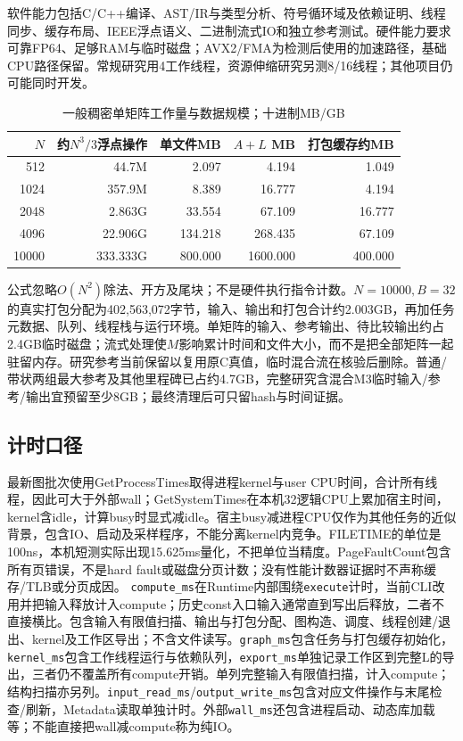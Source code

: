 \documentclass[UTF8,a4paper,11pt]{ctexart}
\begin{document}
软件能力包括C/C++编译、AST/IR与类型分析、符号循环域及依赖证明、线程同步、缓存布局、IEEE浮点语义、二进制流式IO和独立参考测试。硬件能力要求可靠FP64、足够RAM与临时磁盘；AVX2/FMA为检测后使用的加速路径，基础CPU路径保留。常规研究用4工作线程，资源伸缩研究另测8/16线程；其他项目仍可能同时开发。

\begin{table}[htbp]\centering\small
\caption{一般稠密单矩阵工作量与数据规模；十进制MB/GB}
\begin{tabular}{rrrrr}\toprule
$N$&约$N^3/3$浮点操作&单文件MB&$A+L$ MB&打包缓存约MB\\\midrule
512&44.7M&2.097&4.194&1.049\\
1024&357.9M&8.389&16.777&4.194\\
2048&2.863G&33.554&67.109&16.777\\
4096&22.906G&134.218&268.435&67.109\\
10000&333.333G&800.000&1600.000&400.000\\\bottomrule
\end{tabular}
\end{table}
公式忽略$O(N^2)$除法、开方及尾块；不是硬件执行指令计数。$N=10000,B=32$的真实打包分配为402,563,072字节，输入、输出和打包合计约2.003GB，再加任务元数据、队列、线程栈与运行环境。单矩阵的输入、参考输出、待比较输出约占2.4GB临时磁盘；流式处理使$M$影响累计时间和文件大小，而不是把全部矩阵一起驻留内存。研究参考当前保留以复用原C真值，临时混合流在核验后删除。普通/带状两组最大参考及其他里程碑已占约4.7GB，完整研究含混合M3临时输入/参考/输出宜预留至少8GB；最终清理后可只留hash与时间证据。

\subsection{计时口径}
最新图批次使用GetProcessTimes取得进程kernel与user CPU时间，合计所有线程，因此可大于外部wall；GetSystemTimes在本机32逻辑CPU上累加宿主时间，kernel含idle，计算busy时显式减idle\cite{wincpu,winprocesscpu}。宿主busy减进程CPU仅作为其他任务的近似背景，包含IO、启动及采样程序，不能分离kernel内竞争。FILETIME的单位是100ns，本机短测实际出现15.625ms量化，不把单位当精度。PageFaultCount包含所有页错误，不是hard fault或磁盘分页计数；没有性能计数器证据时不声称缓存/TLB或分页成因。
\texttt{compute\_ms}在Runtime内部围绕\texttt{execute}计时，当前CLI改用并把输入释放计入compute；历史const入口输入通常直到写出后释放，二者不直接横比。包含输入有限值扫描、输出与打包分配、图构造、调度、线程创建/退出、kernel及工作区导出；不含文件读写。\texttt{graph\_ms}包含任务与打包缓存初始化，\texttt{kernel\_ms}包含工作线程运行与依赖队列，\texttt{export\_ms}单独记录工作区到完整L的导出，三者仍不覆盖所有compute开销。单列完整输入有限值扫描，计入compute；结构扫描亦另列。\texttt{input\_read\_ms}/\texttt{output\_write\_ms}包含对应文件操作与末尾检查/刷新，Metadata读取单独计时。外部\texttt{wall\_ms}还包含进程启动、动态库加载等；不能直接把wall减compute称为纯IO。
\end{document}
